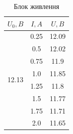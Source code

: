 \documentclass[a4paper,12pt]{article}
\begin{document}
	\begin{table}[h]
		\centering
		\caption{Блок живлення}
		\begin{tabular}{|c|c|c|}
			\hline
			\textbf{$U_0, B$}      & \textbf{$I, A$} & \textbf{$U, B$} \\ \hline
			\multirow{8}{*}{12.13} & 0.25            & 12.09           \\ \cline{2-3} 
			& 0.5             & 12.02           \\ \cline{2-3} 
			& 0.75            & 11.9            \\ \cline{2-3} 
			& 1.0             & 11.85           \\ \cline{2-3} 
			& 1.25            & 11.8            \\ \cline{2-3} 
			& 1.5             & 11.77           \\ \cline{2-3} 
			& 1.75            & 11.71           \\ \cline{2-3} 
			& 2.0             & 11.65           \\ \hline
		\end{tabular}
	\end{table}
\end{document}
